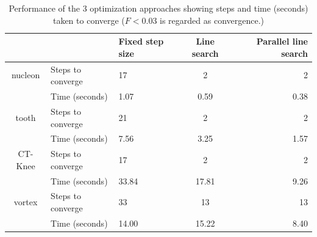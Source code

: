 \begin{table}[h]
	\begin{tabular}{ c | l | l c r }
		& & Fixed step size & Line search & Parallel line search \\
		\hline
		nucleon & Steps to converge & 17 & 2 & 2 \\
		& Time (seconds) & 1.07 & 0.59 & 0.38 \\
		\hline
		tooth & Steps to converge & 21 & 2 & 2 \\
		& Time (seconds) & 7.56 & 3.25 & 1.57 \\
		\hline
		CT-Knee & Steps to converge & 17 & 2 & 2 \\
		& Time (seconds) & 33.84 & 17.81 & 9.26 \\
		\hline
		vortex & Steps to converge & 33 & 13 & 13 \\
		& Time (seconds) & 14.00 & 15.22 & 8.40 \\
	\end{tabular}
	\caption[Performance of the 3 optimization approaches]{Performance of the 3 optimization approaches showing steps and time (seconds) taken to converge ($ F<0.03 $ is regarded as convergence.)}
	\label{table:performance_table}
\end{table}


